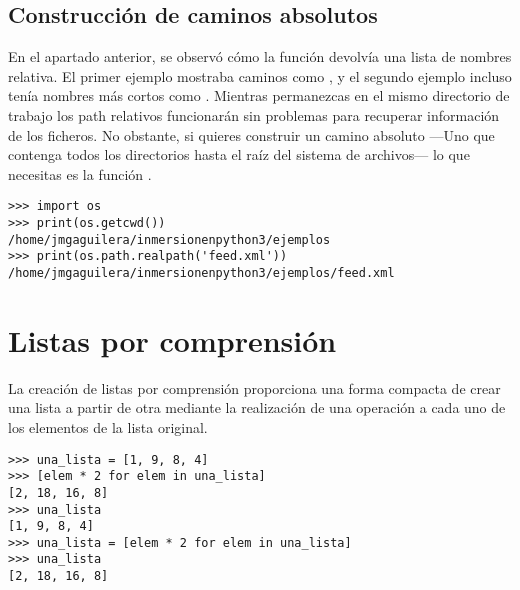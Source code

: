 \subsection{Construcción de caminos absolutos}

En el apartado anterior, se observó cómo la función  devolvía una lista de nombres relativa. El primer ejemplo mostraba caminos como , y el segundo ejemplo incluso tenía nombres más cortos como . Mientras permanezcas en el mismo directorio de trabajo los path relativos funcionarán sin problemas para recuperar información de los ficheros. No obstante, si quieres construir un camino absoluto ---Uno que contenga todos los directorios hasta el raíz del sistema de archivos--- lo que necesitas es la función .

\noindent\begin{minipage}{\textwidth}
\begin{lstlisting}[mathescape=True]
>>> import os
>>> print(os.getcwd())
/home/jmgaguilera/inmersionenpython3/ejemplos
>>> print(os.path.realpath('feed.xml'))
/home/jmgaguilera/inmersionenpython3/ejemplos/feed.xml
\end{lstlisting}
\end{minipage}

\section{Listas por comprensión}

La creación de listas por comprensión proporciona una forma compacta de crear una lista a partir de otra mediante la realización de una operación a cada uno de los elementos de la lista original.

\noindent\begin{minipage}{\textwidth}
\begin{lstlisting}[mathescape=True]
>>> una_lista = [1, 9, 8, 4]
>>> [elem * 2 for elem in una_lista]
[2, 18, 16, 8]
>>> una_lista
[1, 9, 8, 4]
>>> una_lista = [elem * 2 for elem in una_lista]
>>> una_lista
[2, 18, 16, 8]
\end{lstlisting}
\end{minipage}

